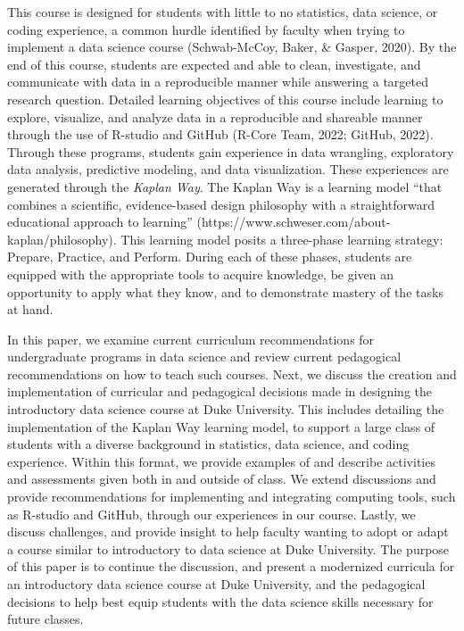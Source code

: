 \documentclass[
  12pt]{article}
\begin{document}
This course is designed for students with little to no statistics, data
science, or coding experience, a common hurdle identified by faculty
when trying to implement a data science course (Schwab-McCoy, Baker, \&
Gasper, 2020). By the end of this course, students are expected and able
to clean, investigate, and communicate with data in a reproducible
manner while answering a targeted research question. Detailed learning
objectives of this course include learning to explore, visualize, and
analyze data in a reproducible and shareable manner through the use of
R-studio and GitHub (R-Core Team, 2022; GitHub, 2022). Through these
programs, students gain experience in data wrangling, exploratory data
analysis, predictive modeling, and data visualization. These experiences
are generated through the \emph{Kaplan Way}. The Kaplan Way is a
learning model ``that combines a scientific, evidence-based design
philosophy with a straightforward educational approach to learning''
(https://www.schweser.com/about-kaplan/philosophy). This learning model
posits a three-phase learning strategy: Prepare, Practice, and Perform.
During each of these phases, students are equipped with the appropriate
tools to acquire knowledge, be given an opportunity to apply what they
know, and to demonstrate mastery of the tasks at hand.

In this paper, we examine current curriculum recommendations for
undergraduate programs in data science and review current pedagogical
recommendations on how to teach such courses. Next, we discuss the
creation and implementation of curricular and pedagogical decisions made
in designing the introductory data science course at Duke University.
This includes detailing the implementation of the Kaplan Way learning
model, to support a large class of students with a diverse background in
statistics, data science, and coding experience. Within this format, we
provide examples of and describe activities and assessments given both
in and outside of class. We extend discussions and provide
recommendations for implementing and integrating computing tools, such
as R-studio and GitHub, through our experiences in our course. Lastly,
we discuss challenges, and provide insight to help faculty wanting to
adopt or adapt a course similar to introductory to data science at Duke
University. The purpose of this paper is to continue the discussion, and
present a modernized curricula for an introductory data science course
at Duke University, and the pedagogical decisions to help best equip
students with the data science skills necessary for future classes.
\end{document}
